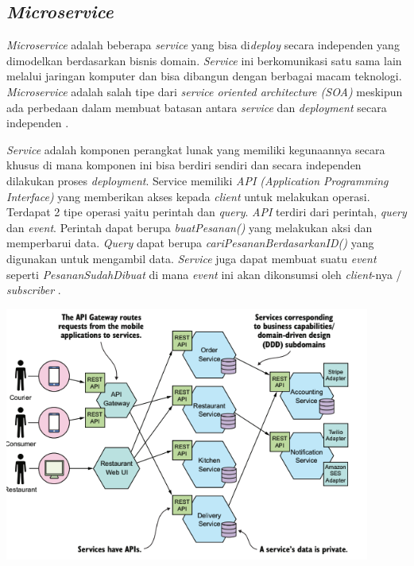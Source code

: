 \subsection{\textit{Microservice}}
\textit{Microservice} adalah beberapa \textit{service} yang bisa di\textit{deploy} secara independen yang dimodelkan berdasarkan bisnis domain. \textit{Service} ini berkomunikasi satu sama lain melalui jaringan komputer dan bisa dibangun dengan berbagai macam teknologi. \textit{Microservice} adalah salah tipe dari \textit{service oriented architecture (SOA)} meskipun ada perbedaan dalam membuat batasan antara \textit{service} dan \textit{deployment} secara independen \cite{74C}.

\textit{Service} adalah komponen perangkat lunak yang memiliki kegunaannya secara khusus di mana komponen ini bisa berdiri sendiri dan secara independen dilakukan proses \textit{deployment}. Service memiliki \textit{API (Application Programming Interface)} yang memberikan akses kepada \textit{client} untuk melakukan operasi. Terdapat 2 tipe operasi yaitu perintah dan \textit{query}.
\textit{API} terdiri dari perintah, \textit{query} dan \textit{event}. Perintah dapat berupa \textit{buatPesanan()} yang melakukan aksi dan memperbarui data. \textit{Query} dapat berupa \textit{cariPesananBerdasarkanID()} yang digunakan untuk mengambil data. \textit{Service} juga dapat membuat suatu \textit{event} seperti \textit{PesananSudahDibuat} di mana \textit{event} ini akan dikonsumsi oleh \textit{client}-nya / \textit{subscriber} \cite{1C7}.

\begin{center}
	\includegraphics[width=12cm]{img/bab_2/micro_arch.png}
	\label{fig:msa}
\end{center}

